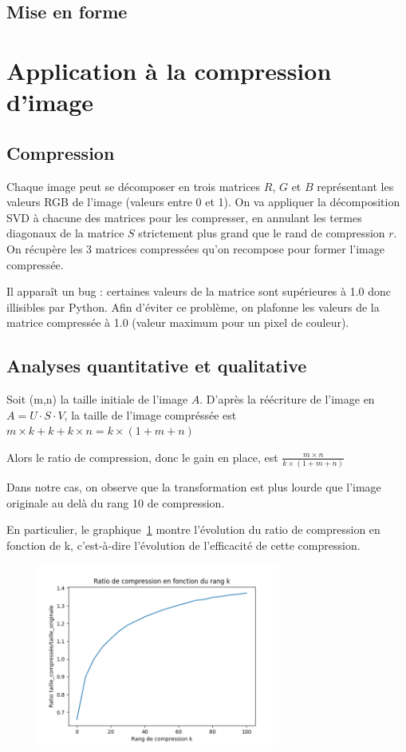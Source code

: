 \documentclass{article}
\begin{document}
\subsection{Mise en forme}
\label{ssec:mise_en_forme_qr}


\section{Application à la compression d'image}
\label{sec:appli_compr_img}

\subsection{Compression}
\label{ssec:compr_img}

Chaque image peut se décomposer en trois matrices $R$, $G$ et $B$ représentant les valeurs RGB de l'image (valeurs entre 0 et 1).
On va appliquer la décomposition SVD à chacune des matrices pour les compresser, en annulant les termes diagonaux
de la matrice $S$ strictement plus grand que le rand de compression $r$. On récupère les 3 matrices compressées qu'on
recompose pour former l'image compressée. 

Il apparaît un bug : certaines valeurs de la matrice sont supérieures à 1.0 donc illisibles par Python. 
Afin d'éviter ce problème, on plafonne les valeurs de la matrice compressée à 1.0 (valeur maximum pour un pixel de couleur).

\subsection{Analyses quantitative et qualitative}
\label{ssec:quanti_img}

Soit (m,n) la taille initiale de l'image $A$.
D'après la réécriture de l'image en $A = U \cdot S \cdot V$,
la taille de l'image compréssée est $m \times k + k + k \times n = k \times (1+m+n)$

Alors le ratio de compression, donc le gain en place, est $\frac{m \times n}{k \times (1+m+n)}$ \newline

Dans notre cas, on observe que la transformation est plus lourde que l'image originale au delà du rang 10 de compression.

En particulier, le graphique~\ref{img:ratioCompression} montre l'évolution du ratio de compression en fonction de k, c'est-à-dire l'évolution
de l'efficacité de cette compression.

\begin{figure}[!htb]
  \caption[]{}
  \label{img:ratioCompression}
  \centering
  \includegraphics[width=8cm]{../files/ratio_de_compression.png}
\end{figure}
\end{document}
